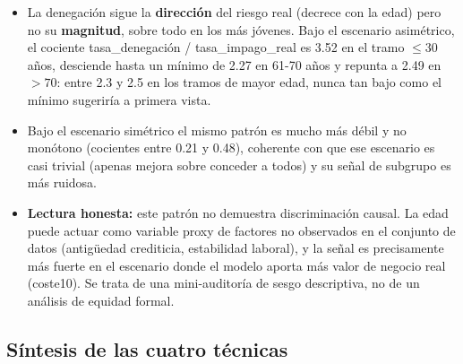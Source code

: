 \documentclass[11pt,a4paper]{article}
\begin{document}
\begin{itemize}
\item La denegación sigue la \textbf{dirección} del riesgo real (decrece con la edad) pero no su
\textbf{magnitud}, sobre todo en los más jóvenes. Bajo el escenario asimétrico, el cociente
tasa\_denegación / tasa\_impago\_real es 3.52 en el tramo $\leq 30$ años, desciende hasta un mínimo de 2.27
en 61-70 años y repunta a 2.49 en $>70$: entre 2.3 y 2.5 en los tramos de mayor edad, nunca tan bajo como el
mínimo sugeriría a primera vista.
\item Bajo el escenario simétrico el mismo patrón es mucho más débil y no monótono (cocientes entre 0.21 y
0.48), coherente con que ese escenario es casi trivial (apenas mejora sobre conceder a todos) y su señal de
subgrupo es más ruidosa.
\item \textbf{Lectura honesta:} este patrón no demuestra discriminación causal. La edad puede actuar como
variable proxy de factores no observados en el conjunto de datos (antigüedad crediticia, estabilidad
laboral), y la señal es precisamente más fuerte en el escenario donde el modelo aporta más valor de negocio
real (coste10). Se trata de una mini-auditoría de sesgo descriptiva, no de un análisis de equidad formal.
\end{itemize}

\subsection{Síntesis de las cuatro técnicas}
\end{document}
